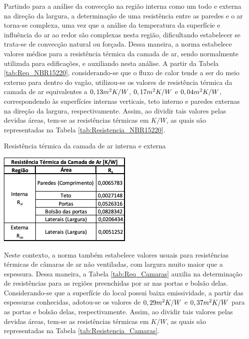 \documentclass[acronym,symbols,table]{fei}
\begin{document}
Partindo para a análise da convecção na região interna como um todo e externa na direção da largura, a determinação de uma resistência entre as paredes e o ar torna-se complexa, uma vez que a análise da temperatura da superfície e influência do ar ao redor são complexas nesta região, dificultando estabelecer se trata-se de convecção natural ou forçada. Dessa maneira, a norma \cite{abnt15220} estabelece valores médios para a resistência térmica da camada de ar, sendo normalmente utilizada para edificações, e auxiliando nesta análise. A partir da Tabela \ref{tab:Req_NBR15220}, considerando-se que o fluxo de calor tende a ser do meio externo para dentro do vagão, utilizou-se os valores de resistência térmica da camada de ar equivalentes a $0,13 \space m^2K/W$, $0,17 \space m^2K/W$ e $0,04 \space m^2K/W$, correspondendo às superfícies internas verticais, teto interno e paredes externas na direção da largura, respectivamente. Assim, ao dividir tais valores pelas devidas áreas, tem-se as resistências térmicas em $K/W$, as quais são representadas na Tabela \ref{tab:Resistencia_NBR15220}.

\begin{table}[!htb] 
 \centering
    \caption{Resistência térmica da camada de ar interna e externa}
    \includegraphics[width=0.4\linewidth]{Tabelas/Resistencia_NBR15220.png}
    \label{tab:Resistencia_NBR15220}
\end{table}

Neste contexto, a norma \cite{abnt15220} também estabelece valores usuais para resistências térmicas de câmaras de ar não ventiladas, com largura muito maior que a espessura. Dessa maneira, a Tabela \ref{tab:Req_Camaras} auxilia na determinação de resistências para as regiões preenchidas por ar nas portas e bolsão delas. Considerando-se que a superfície do local possui baixa emissividade, a partir das espessuras conhecidas, adotou-se os valores de $0,29 \space m^2K/W$ e $0,37 \space m^2K/W$ para as portas e bolsão delas, respectivamente. Assim, ao dividir tais valores pelas devidas áreas, tem-se as resistências térmicas em $K/W$, as quais são representadas na Tabela \ref{tab:Resistencia_Camaras}.
\end{document}
